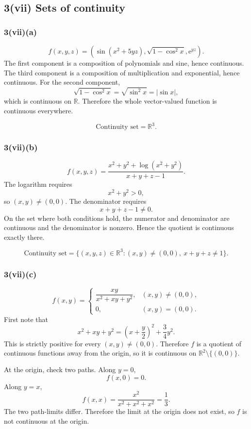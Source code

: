 \documentclass[11pt]{article}
\newcommand{\R}{\mathbb{R}}
\newcommand{\e}{\mathrm e}
\begin{document}
\subsection{3(vii) Sets of continuity}

\subsubsection*{3(vii)(a)}
\[
f(x,y,z)=\left(\sin(x^2+5yz),\sqrt{1-\cos^2x},\e^{yz}\right).
\]
The first component is a composition of polynomials and sine, hence continuous. The third component is a composition of multiplication and exponential, hence continuous. For the second component,
\[
\sqrt{1-\cos^2x}=\sqrt{\sin^2x}=|\sin x|,
\]
which is continuous on \(\R\). Therefore the whole vector-valued function is continuous everywhere.

\begin{answerbox}
\[
\boxed{\text{Continuity set} = \R^3.}
\]
\end{answerbox}

\subsubsection*{3(vii)(b)}
\[
f(x,y,z)=\frac{x^2+y^2+\log(x^2+y^2)}{x+y+z-1}.
\]
The logarithm requires
\[
x^2+y^2>0,
\]
so \((x,y)\neq(0,0)\). The denominator requires
\[
x+y+z-1\neq0.
\]
On the set where both conditions hold, the numerator and denominator are continuous and the denominator is nonzero. Hence the quotient is continuous exactly there.

\begin{answerbox}
\[
\boxed{\text{Continuity set}=\bigl\{(x,y,z)\in\R^3:(x,y)\neq(0,0),\ x+y+z\neq1\bigr\}.}
\]
\end{answerbox}

\subsubsection*{3(vii)(c)}
\[
f(x,y)=
\begin{cases}
\dfrac{xy}{x^2+xy+y^2},&(x,y)\neq(0,0),\\[6pt]
0,&(x,y)=(0,0).
\end{cases}
\]
First note that
\[
x^2+xy+y^2=\left(x+\frac y2\right)^2+\frac34y^2.
\]
This is strictly positive for every \((x,y)\neq(0,0)\). Therefore \(f\) is a quotient of continuous functions away from the origin, so it is continuous on \(\R^2\setminus\{(0,0)\}\).

At the origin, check two paths. Along \(y=0\),
\[
f(x,0)=0.
\]
Along \(y=x\),
\[
f(x,x)=\frac{x^2}{x^2+x^2+x^2}=\frac13.
\]
The two path-limits differ. Therefore the limit at the origin does not exist, so \(f\) is not continuous at the origin.
\end{document}
